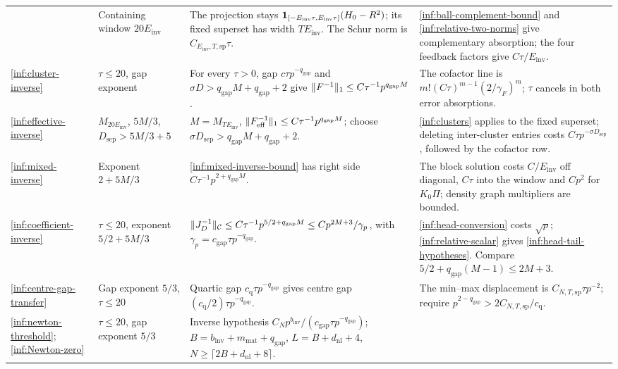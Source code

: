 \begin{lemma}
\begin{longtable}{@{}>{\raggedright\arraybackslash}p{}>{\raggedright\arraybackslash}p{}>{\raggedright\arraybackslash}p{}>{\raggedright\arraybackslash}p{}@{}}
& Containing window $20E_{\mathrm{inv}}$
& The projection stays
$\mathbf{1}_{[-E_{\mathrm{inv}}\tau,E_{\mathrm{inv}}\tau]}(H_0-R^2)$;
its fixed superset has width $TE_{\mathrm{inv}}$.
The Schur norm is $C_{E_{\mathrm{inv}},T,\mathrm{sp}}\tau$.
& \eqref{inf:ball-complement-bound} and
\eqref{inf:relative-two-norms} give complementary absorption;
the four feedback factors give $C\tau/E_{\mathrm{inv}}$.\\
\ref{inf:cluster-inverse}
& $\tau\le20$, gap exponent
& For every $\tau>0$, gap $c\tau p^{-q_{\mathrm{gap}}}$ and
$\sigma D>q_{\mathrm{gap}}M+q_{\mathrm{gap}}+2$ give
$\lVert F^{-1}\rVert_1\le C\tau^{-1}p^{q_{\mathrm{gap}}M}$.
& The cofactor line is $m!(C\tau)^{m-1}(2/\gamma_F)^m$;
$\tau$ cancels in both error absorptions.\\
\ref{inf:effective-inverse}
& $M_{20E_{\mathrm{inv}}}$, $5M/3$, $D_{\mathrm{sep}}>5M/3+5$
& $M=M_{TE_{\mathrm{inv}}}$,
$\lVert F_{\mathrm{eff}}^{-1}\rVert_1\le C\tau^{-1}p^{q_{\mathrm{gap}}M}$;
choose $\sigma D_{\mathrm{sep}}>q_{\mathrm{gap}}M+q_{\mathrm{gap}}+2$.
& \ref{inf:clusters} applies to the fixed superset;
deleting inter-cluster entries costs
$C\tau p^{-\sigma D_{\mathrm{sep}}}$, followed by the cofactor row.\\
\ref{inf:mixed-inverse}
& Exponent $2+5M/3$
& \eqref{inf:mixed-inverse-bound} has right side
$C\tau^{-1}p^{2+q_{\mathrm{gap}}M}$.
& The block solution costs $C/E_{\mathrm{inv}}$ off diagonal,
$C\tau$ into the window and $Cp^2$ for $K_0\Pi$;
density graph multipliers are bounded.\\
\ref{inf:coefficient-inverse}
& $\tau\le20$, exponent $5/2+5M/3$
& $\lVert J_D^{-1}\rVert_\mathcal C\le C\tau^{-1}p^{5/2+q_{\mathrm{gap}}M}
\le Cp^{2M+3}/\gamma_p$, with
$\gamma_p=c_{\mathrm{gap}}\tau p^{-q_{\mathrm{gap}}}$.
& \eqref{inf:head-conversion} costs $\sqrt p$;
\eqref{inf:relative-scalar} gives \eqref{inf:head-tail-hypotheses}.
Compare $5/2+q_{\mathrm{gap}}(M-1)\le2M+3$.\\
\ref{inf:centre-gap-transfer}
& Gap exponent $5/3$, $\tau\le20$
& Quartic gap $c_{\mathrm q}\tau p^{-q_{\mathrm{gap}}}$
gives centre gap $(c_{\mathrm q}/2)\tau p^{-q_{\mathrm{gap}}}$.
& The min--max displacement is $C_{N,T,\mathrm{sp}}\tau p^{-2}$;
require $p^{2-q_{\mathrm{gap}}}>2C_{N,T,\mathrm{sp}}/c_{\mathrm q}$.\\
\ref{inf:newton-threshold};
\ref{inf:Newton-zero}
& $\tau\le20$, gap exponent $5/3$
& Inverse hypothesis
$C_Np^{b_{\mathrm{inv}}}/(c_{\mathrm{gap}}\tau p^{-q_{\mathrm{gap}}})$;
$B=b_{\mathrm{inv}}+m_{\mathrm{mat}}+q_{\mathrm{gap}}$,
$L=B+d_{\mathrm{nl}}+4$, $N\ge\lceil2B+d_{\mathrm{nl}}+8\rceil$.

\end{longtable}
\end{lemma}
